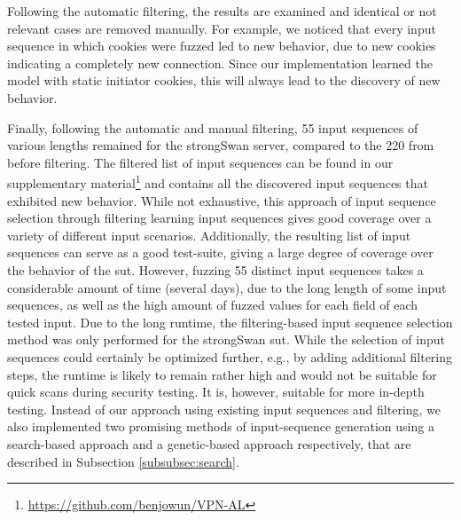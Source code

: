 Following the automatic filtering, the results are examined and identical or not relevant cases are removed manually. For example, we noticed that every input sequence in which cookies were fuzzed led to new behavior, due to new cookies indicating a completely new connection. Since our implementation learned the model with static initiator cookies, this will always lead to the discovery of new behavior. 

\newpage
Finally, following the automatic and manual filtering, 55 input sequences of various lengths remained for the strongSwan server, compared to the 220 from before filtering. The filtered list of input sequences can be found in our supplementary material\footnote{\url{https://github.com/benjowun/VPN-AL}} and contains all the discovered input sequences that exhibited new behavior. While not exhaustive, this approach of input sequence selection through filtering learning input sequences gives good coverage over a variety of different input scenarios. Additionally, the resulting list of input sequences can serve as a good test-suite, giving a large degree of coverage over the behavior of the \ac{sut}. However, fuzzing 55 distinct input sequences takes a considerable amount of time (several days), due to the long length of some input sequences, as well as the high amount of fuzzed values for each field of each tested input. Due to the long runtime, the filtering-based input sequence selection method was only performed for the strongSwan \ac{sut}. While the selection of input sequences could certainly be optimized further, e.g., by adding additional filtering steps, the runtime is likely to remain rather high and would not be suitable for quick scans during security testing. It is, however, suitable for more in-depth testing. Instead of our approach using existing input sequences and filtering, we also implemented two promising methods of input-sequence generation using a search-based approach and a genetic-based approach respectively, that are described in Subsection \ref{subsubsec:search}.

